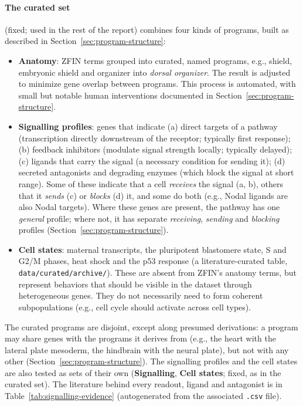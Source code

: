 \documentclass[11pt,a4paper]{article}
\begin{document}
\paragraph{The curated set} (fixed; used in the rest of the report) combines four kinds of programs, built as described in Section~\ref{sec:program-structure}:
\begin{itemize}
	\item \textbf{Anatomy}: ZFIN terms grouped into curated, named programs, e.g., shield, embryonic shield and organizer into \emph{dorsal organizer}. The result is adjusted to minimize gene overlap between programs. This process is automated, with small but notable human interventions documented in Section~\ref{sec:program-structure}.
	\item \textbf{Signalling profiles}: genes that indicate (a) direct targets of a pathway (transcription directly downstream of the receptor; typically first response); (b) feedback inhibitors (modulate signal strength locally; typically delayed); (c) ligands that carry the signal (a necessary condition for sending it); (d) secreted antagonists and degrading enzymes (which block the signal at short range). Some of these indicate that a cell \emph{receives} the signal (a, b), others that it \emph{sends} (c) or \emph{blocks} (d) it, and some do both (e.g., Nodal ligands are also Nodal targets). Where these genes are present, the pathway has one \emph{general} profile; where not, it has separate \emph{receiving}, \emph{sending} and \emph{blocking} profiles (Section~\ref{sec:program-structure}).
	\item \textbf{Cell states}: maternal transcripts, the pluripotent blastomere state, S and G2/M phases, heat shock and the p53 response (a literature-curated table, \nolinkurl{data/curated/archive/}). These are absent from ZFIN's anatomy terms, but represent behaviors that should be visible in the dataset through heterogeneous genes. They do not necessarily need to form coherent subpopulations (e.g., cell cycle should activate across cell types).
\end{itemize}
The curated programs are disjoint, except along presumed derivations: a program may share genes with the programs it derives from (e.g., the heart with the lateral plate mesoderm, the hindbrain with the neural plate), but not with any other (Section~\ref{sec:program-structure}). The signalling profiles and the cell states are also tested as sets of their own (\textbf{Signalling}, \textbf{Cell states}; fixed, as in the curated set). The literature behind every readout, ligand and antagonist is in Table~\ref{tab:signalling-evidence} (autogenerated from the associated \texttt{.csv} file).
\end{document}
